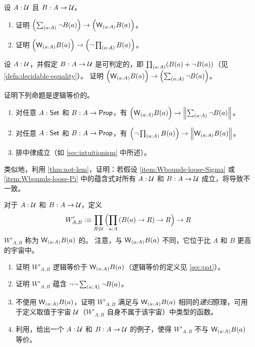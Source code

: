 \begin{ex}\label{ex:Wbounds}
  设 $A:\mathcal{U}$ 且 $B:A\to \mathcal{U}$。
  \begin{enumerate}
  \item 证明 $\Parens{\sm{a:A} \neg B(a)} \to \Parens{\wtype{a:A} B(a)}$。
  \item 证明 $\Parens{\wtype{a:A} B(a)} \to \Parens{\neg \prd{a:A} B(a)}$。
  \end{enumerate}
\end{ex}

\begin{ex}\label{ex:Wdec}
  设 $A:\mathcal{U}$，并假定 $B:A\to \mathcal{U}$ 是可判定的，即 $\prd{a:A} (B(a)+\neg B(a))$（见 \cref{defn:decidable-equality}）。
  证明 $\Parens{\wtype{a:A} B(a)} \to \Parens{\sm{a:A} \neg B(a)}$。
\end{ex}

\begin{ex}\label{ex:Wbounds-loose}
  证明下列命题是逻辑等价的。
  \begin{enumerate}
  \item 对任意 $A:\mathsf{Set}$ 和 $B:A\to \mathsf{Prop}$，有 $\Parens{\wtype{a:A} B(a)} \to \Brck{\sm{a:A} \neg B(a)}$。\label{item:Wbounds-loose-Sigma}
  \item 对任意 $A:\mathsf{Set}$ 和 $B:A\to \mathsf{Prop}$，有 $\Parens{\neg \prd{a:A} B(a)} \to \Brck{\wtype{a:A} B(a)}$。\label{item:Wbounds-loose-Pi}
  \item 排中律成立（如 \cref{sec:intuitionism} 中所述）。
  \end{enumerate}
  类似地，利用 \cref{thm:not-lem}，证明：若假设 \ref{item:Wbounds-loose-Sigma} 或 \ref{item:Wbounds-loose-Pi} 中的蕴含式对所有 $A:\mathcal{U}$ 和 $B:A\to \mathcal{U}$ 成立，将导致不一致。
\end{ex}

\begin{ex}\label{ex:Wimpred}
  对于 $A:\mathcal{U}$ 和 $B:A\to \mathcal{U}$，定义
  \[ W'_{A,B} \defeq \prd{R:\UU} \Parens{\prd{a:A} (B(a) \to R) \to R} \to R \]
  $W'_{A,B}$ 称为 $\wtype{a:A} B(a)$ 的。
  注意，与 $\wtype{a:A} B(a)$ 不同，它位于比 $A$ 和 $B$ 更高的宇宙中。
  \begin{enumerate}
  \item 证明 $W'_{A,B}$ 逻辑等价于 $\wtype{a:A} B(a)$（逻辑等价的定义见 \cref{sec:pat}）。
  \item 证明 $W'_{A,B}$ 蕴含 $\neg\neg \sm{a:A} \neg B(a)$。
  \item 不使用 $\wtype{a:A} B(a)$，证明 $W'_{A,B}$ 满足与 $\wtype{a:A} B(a)$ 相同的\emph{递归}原理，可用于定义取值于宇宙 $\mathcal{U}$（$W'_{A,B}$ 自身不属于该宇宙）中类型的函数。
  \item 利用\LEM，给出一个 $A:\mathcal{U}$ 和 $B:A\to \mathcal{U}$ 的例子，使得 $W'_{A,B}$ 不与 $\wtype{a:A} B(a)$ 等价。
  \end{enumerate}
\end{ex}

